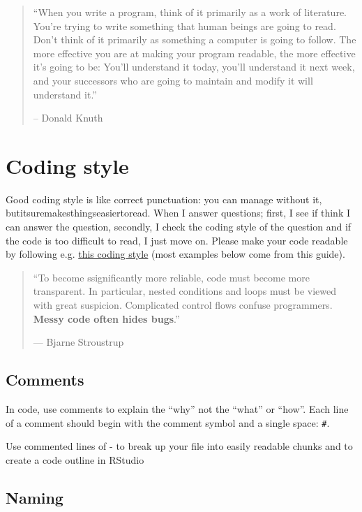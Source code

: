 \documentclass[]{book}
\theoremstyle{definition}
\theoremstyle{definition}
\theoremstyle{definition}
\theoremstyle{remark}
\let\BeginKnitrBlock\begin \let\EndKnitrBlock\end
\begin{document}
\begin{quote}
``When you write a program, think of it primarily as a work of
literature. You're trying to write something that human beings are going
to read. Don't think of it primarily as something a computer is going to
follow. The more effective you are at making your program readable, the
more effective it's going to be: You'll understand it today, you'll
understand it next week, and your successors who are going to maintain
and modify it will understand it.''

-- Donald Knuth
\end{quote}

\section{Coding style}\label{coding-style}

Good coding style is like correct punctuation: you can manage without
it, butitsuremakesthingseasiertoread. When I answer questions; first, I
see if think I can answer the question, secondly, I check the coding
style of the question and if the code is too difficult to read, I just
move on. Please make your code readable by following e.g.
\href{http://style.tidyverse.org/}{this coding style} (most examples
below come from this guide).

\begin{quote}
``To become ssignificantly more reliable, code must become more
transparent. In particular, nested conditions and loops must be viewed
with great suspicion. Complicated control flows confuse programmers.
\textbf{Messy code often hides bugs}.''

--- Bjarne Stroustrup
\end{quote}

\subsection{Comments}\label{comments}

In code, use comments to explain the ``why'' not the ``what'' or
``how''. Each line of a comment should begin with the comment symbol and
a single space: \texttt{\#}.

\BeginKnitrBlock{rmdtip}
Use commented lines of - to break up your file into easily readable
chunks and to create a code outline in RStudio
\EndKnitrBlock{rmdtip}

\subsection{Naming}\label{naming}
\end{document}
